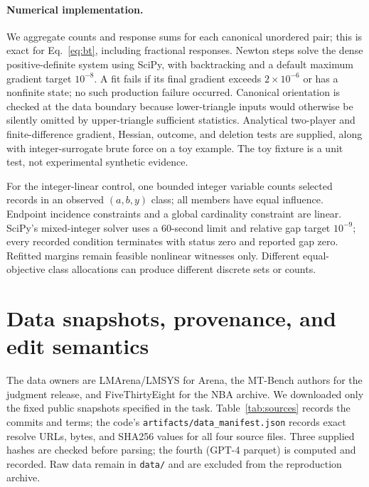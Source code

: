 \paragraph{Numerical implementation.}
We aggregate counts and response sums for each canonical unordered pair; this is exact for Eq.~\eqref{eq:bt}, including fractional responses. Newton steps solve the dense positive-definite system using SciPy, with backtracking and a default maximum gradient target $10^{-8}$. A fit fails if its final gradient exceeds $2\times10^{-6}$ or has a nonfinite state; no such production failure occurred. Canonical orientation is checked at the data boundary because lower-triangle inputs would otherwise be silently omitted by upper-triangle sufficient statistics. Analytical two-player and finite-difference gradient, Hessian, outcome, and deletion tests are supplied, along with integer-surrogate brute force on a toy example. The toy fixture is a unit test, not experimental synthetic evidence.

For the integer-linear control, one bounded integer variable counts selected records in an observed $(a,b,y)$ class; all members have equal influence. Endpoint incidence constraints and a global cardinality constraint are linear. SciPy's mixed-integer solver uses a 60-second limit and relative gap target $10^{-9}$; every recorded condition terminates with status zero and reported gap zero. Refitted margins remain feasible nonlinear witnesses only. Different equal-objective class allocations can produce different discrete sets or counts.

\section{Data snapshots, provenance, and edit semantics}\label{app:data}
The data owners are LMArena/LMSYS for Arena, the MT-Bench authors for the judgment release, and FiveThirtyEight for the NBA archive. We downloaded only the fixed public snapshots specified in the task. Table~\ref{tab:sources} records the commits and terms; the code's \texttt{artifacts/data\_manifest.json} records exact resolve URLs, bytes, and SHA256 values for all four source files. Three supplied hashes are checked before parsing; the fourth (GPT-4 parquet) is computed and recorded. Raw data remain in \texttt{data/} and are excluded from the reproduction archive.

